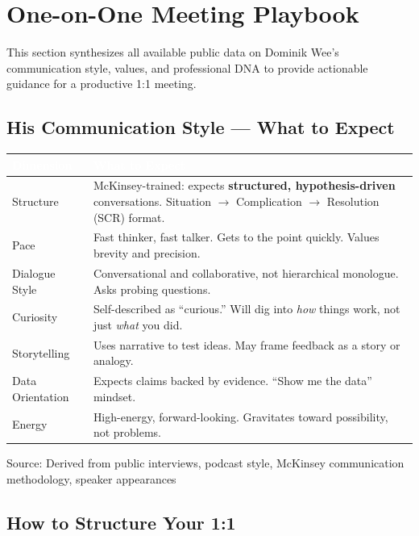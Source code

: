 \documentclass[11pt,a4paper]{article}
\begin{document}
\section{One-on-One Meeting Playbook}

This section synthesizes all available public data on Dominik Wee's communication style, values, and professional DNA to provide actionable guidance for a productive 1:1 meeting.

\subsection{His Communication Style --- What to Expect}

\begin{center}
\begin{longtable}{L{3.5cm}L{10cm}}
\toprule
{}
\textcolor{white}{\textbf{Dimension}} & \textcolor{white}{\textbf{What to Expect}} \\
\midrule
Structure & McKinsey-trained: expects \textbf{structured, hypothesis-driven} conversations. Situation $\rightarrow$ Complication $\rightarrow$ Resolution (SCR) format. \\
Pace & Fast thinker, fast talker. Gets to the point quickly. Values brevity and precision. \\
Dialogue Style & Conversational and collaborative, not hierarchical monologue. Asks probing questions. \\
Curiosity & Self-described as ``curious.'' Will dig into \textit{how} things work, not just \textit{what} you did. \\
Storytelling & Uses narrative to test ideas. May frame feedback as a story or analogy. \\
Data Orientation & Expects claims backed by evidence. ``Show me the data'' mindset. \\
Energy & High-energy, forward-looking. Gravitates toward possibility, not problems. \\
\bottomrule
\end{longtable}
\end{center}

\textcolor{msgray}{\scriptsize Source: Derived from public interviews, podcast style, McKinsey communication methodology, speaker appearances}

\subsection{How to Structure Your 1:1}
\end{document}
